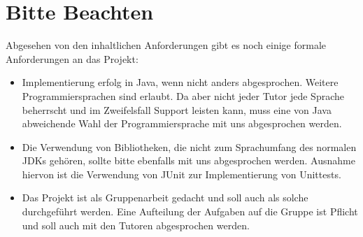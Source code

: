 \documentclass{programmierpraktikum}
\begin{document}
\section{Bitte Beachten}
Abgesehen von den inhaltlichen Anforderungen gibt es noch einige formale Anforderungen an das
Projekt:
\begin{itemize}
  \item Implementierung erfolg in Java, wenn nicht anders abgesprochen. Weitere Programmiersprachen sind erlaubt. Da aber nicht jeder Tutor jede Sprache beherrscht und im Zweifelsfall Support leisten kann, muss eine von Java abweichende Wahl der Programmiersprache mit uns abgesprochen werden.
  \item Die Verwendung von Bibliotheken, die nicht zum Sprachumfang des normalen JDKs gehören, sollte bitte ebenfalls mit uns abgesprochen werden. Ausnahme hiervon ist die Verwendung von JUnit zur Implementierung von Unittests.
  \item Das Projekt ist als Gruppenarbeit gedacht und soll auch als solche durchgeführt werden. Eine Aufteilung der Aufgaben auf die Gruppe ist Pflicht und soll auch mit den Tutoren abgesprochen werden.
\end{itemize}
\end{document}
